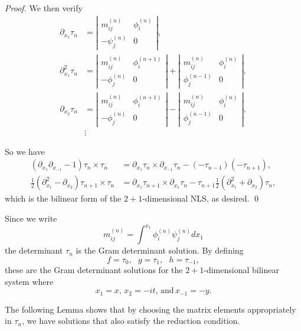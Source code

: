 \documentclass{beamer}
\def\e{\end}
\theoremstyle{plain}
\theoremstyle{definition}
\begin{document}
\frame
{
\emph{Proof.} We then verify
\begin{align*} \partial _{x_1} \tau _n & = \left | \begin{array}{cc} m_{ij} ^{(n)} & \phi _i ^{(n)} \\ - \psi _j ^{(n)} & 0 \end{array} \right | ,\\
\partial _{x_1} ^2 \tau _n & = \left | \begin{array}{cc} m_{ij} ^{(n)} & \phi _i ^{(n+1)} \\ - \phi _j ^{(n)} & 0 \end{array} \right | + \left | \begin{array}{cc} m_{ij} ^{(n)} & \phi _i ^{(n)} \\ \phi _j ^{(n-1)} & 0 \end{array} \right | ,\\
\partial _{x_2} \tau _n & = \left | \begin{array}{cc} m_{ij} ^{(n)} & \phi _i ^{(n+1)} \\ - \phi _j ^{(n)} & 0 \end{array} \right | - \left | \begin{array}{cc} m_{ij} ^{(n)} & \phi _i ^{(n)} \\ \phi _j ^{(n-1)} & 0 \end{array} \right | ,\\
& \vdots \end{align*}
}

\frame
{
So we have \begin{align*} (\partial _{x_1} \partial _{x_{-1}} - 1) \tau _n \times \tau _n & = \partial _{x_1} \tau _n \times \partial _{x_{-1}} \tau _n - ( - \tau _{n-1} )(-\tau _{n+1}) ,\\
\tfrac{1}{2} (\partial _{x_1} ^2 - \partial _{x_2} ) \tau _{n+1} \times \tau _n  & = \partial _{x_1} \tau _{n+1} \times \partial _{x_1} \tau _n  - \tau _{n+1} \tfrac{1}{2} (\partial _{x_1} ^2 + \partial _{x_2} ) \tau _n , \end{align*}
which is the bilinear form of the $2+1$-dimensional NLS, as desired. \qed\\
}

\frame
{
Since we write $$ m_{ij} ^{(n)} = \int ^{x_1} \phi _i ^{(n)} \psi _j ^{(n)} dx_1 $$ the determinant $\tau _n$ is the Gram determinant solution. By defining 
\begin{equation*}\tag{3.11}
f= \tau _0, ~~~g=\tau _1 ,~~~h=\tau _{-1},
\end{equation*}
these are the Gram determinant solutions for the $2+1$-dimensional bilinear system where
\begin{equation*}\tag{3.12}
x_1=x,\,x_2=-it,\,\text{and}\,x_{-1}=-y.
\e{equation*}

The following Lemma shows that by choosing the matrix elements appropriately in $\tau _n$, we have solutions that also satisfy the reduction condition.
}
\end{document}
